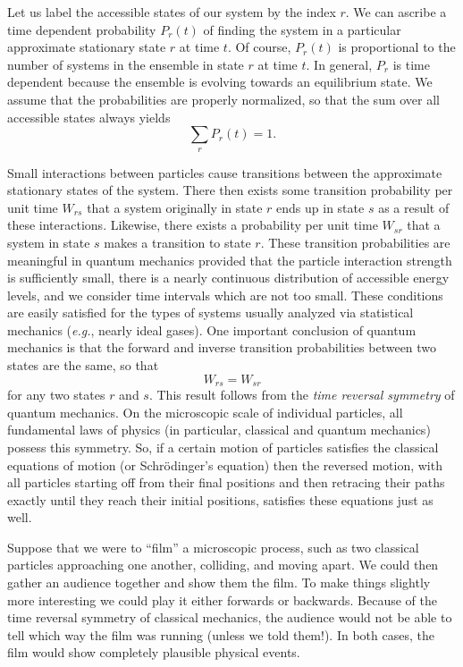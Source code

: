 Let us label the accessible states of our system by the index $r$. We can
ascribe a time dependent probability $P_r(t)$ of finding the system 
in a particular approximate stationary 
state $r$ at time $t$. Of course, $P_r(t)$ is proportional
to the number of systems in the ensemble in state $r$ at time $t$. In general,
$P_r$ is time dependent because the ensemble is evolving towards an
equilibrium state. We assume that the probabilities are properly
normalized, so that the sum over all accessible states always yields
\begin{equation}
\sum_r P_r(t) =1.
\end{equation}

Small interactions between particles cause transitions between the approximate
stationary states of the system. There then exists some transition probability
per unit time $W_{rs}$ that a system originally in state $r$ ends up in state
$s$ as a result of these interactions. Likewise, there exists a probability
per unit time $W_{sr}$ that a system in state $s$ makes a transition to
state $r$. These transition probabilities are meaningful in quantum mechanics
provided that the particle interaction strength is sufficiently small, there is
a nearly continuous distribution of accessible energy levels, and we consider time
intervals which are not too small. These conditions are easily satisfied for
the types of systems usually analyzed  via  statistical mechanics ({\em e.g.},
nearly ideal gases). One important conclusion  of quantum
mechanics is that the forward and inverse transition probabilities between two
states are the same, so that
\begin{equation}
W_{rs} = W_{sr}\label{e3.9}
\end{equation}
for any two states $r$ and $s$. This result 
follows from the {\em time reversal symmetry}\/ of quantum mechanics. On the
microscopic scale of individual particles, all fundamental laws of physics
(in particular, classical and quantum mechanics)
possess this symmetry. 
So, if a certain motion of particles satisfies the classical equations of
motion (or Schr\"{o}dinger's equation)
then the reversed motion, with all particles starting off from their
final positions  and then retracing their paths exactly
until they reach their initial positions, 
satisfies these  equations just as well.


Suppose that we were to ``film'' a microscopic
process, such as two classical particles approaching one another, colliding,
and  moving apart. We could then gather an audience together
 and show them the film. To make things slightly more
interesting we could play it either forwards or backwards.
 Because of the time
reversal symmetry of classical mechanics, the audience would not be able
to tell which way the film was running (unless we told them!). 
In both cases, the  film would show completely plausible physical events. 

